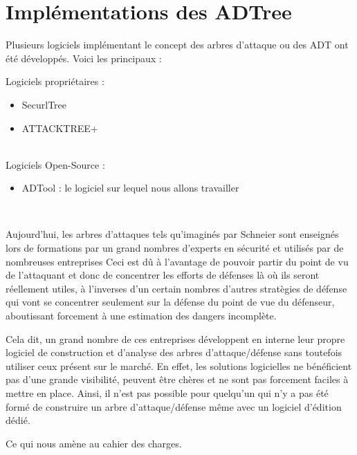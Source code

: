 	\section{Implémentations des ADTree}
		Plusieurs logiciels implémentant le concept des arbres d'attaque ou des ADT ont été développés. Voici les principaux :
        
		{\large Logiciels propriétaires :}
		\begin{itemize}
			\item SecurlTree
			\item ATTACKTREE+
		\end{itemize}
		~~\\
		{\large Logiciels Open-Source :}
		\begin{itemize}
			\item ADTool : le logiciel sur lequel nous allons travailler
		\end{itemize}
~~

		Aujourd'hui, les arbres d'attaques tels qu'imaginés par Schneier sont enseignés lors de formations par un grand nombres d'experts en sécurité et utilisés par de nombreuses entreprises Ceci est dû à l'avantage de pouvoir partir du point de vu de l'attaquant et donc de concentrer les efforts de défenses là où ils seront réellement utiles, à l'inverses d'un certain nombres d'autres stratègies de défense qui vont se concentrer seulement sur la défense du point de vue du défenseur, aboutissant forcement à une estimation des dangers incomplète. 

		Cela dit, un grand nombre de ces entreprises développent en interne leur propre logiciel de construction et d'analyse des arbres d'attaque/défense sans toutefois utiliser ceux présent sur le marché. En effet, les solutions logicielles ne bénéficient pas d'une grande visibilité, peuvent être chères et ne sont pas forcement faciles à mettre en place. Ainsi, il n'est pas possible pour quelqu'un qui n'y a pas été formé de construire un arbre d'attaque/défense même avec un logiciel d'édition dédié.

		Ce qui nous amène au cahier des charges.


